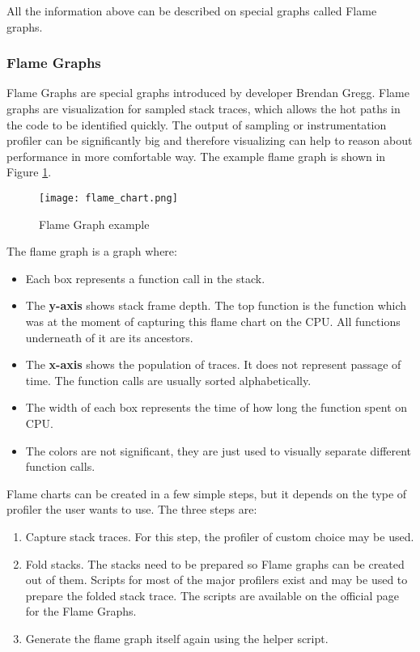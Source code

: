 All the information above can be described on special graphs called Flame graphs.
\subsubsection{Flame Graphs}
Flame Graphs are special graphs introduced by developer Brendan Gregg. Flame graphs are visualization for sampled stack traces, which allows the hot paths in the code to be identified quickly. The output of sampling or instrumentation profiler can be significantly big and therefore visualizing can help to reason about performance in more comfortable way. The example flame graph is shown in Figure \ref{fig:flame_chart}.

\begin{figure}
	\centering
	\texttt{[image: flame\_chart.png]}
	\caption{Flame Graph example}
	\label{fig:flame_chart}
\end{figure}
The flame graph is a graph where:
\begin{itemize}
	\item Each box represents a function call in the stack.
	\item The \textbf{y-axis} shows stack frame depth. The top function is the function which was at the moment of capturing this flame chart on the CPU. All functions underneath of it are its ancestors.
	\item The \textbf{x-axis} shows the population of traces. It does not represent passage of time. The function calls are usually sorted alphabetically.
	\item The width of each box represents the time of how long the function spent on CPU.
	\item The colors are not significant, they are just used to visually separate different function calls.
\end{itemize}

Flame charts can be created in a few simple steps, but it depends on the type of profiler the user wants to use. The three steps are:
\begin{enumerate}
	\item Capture stack traces. For this step, the profiler of custom choice may be used.
	\item Fold stacks. The stacks need to be prepared so Flame graphs can be created out of them. Scripts for most of the major profilers exist and may be used to prepare the folded stack trace. The scripts are available on the official page for the Flame Graphs.
	\item Generate the flame graph itself again using the helper script.
\end{enumerate}

